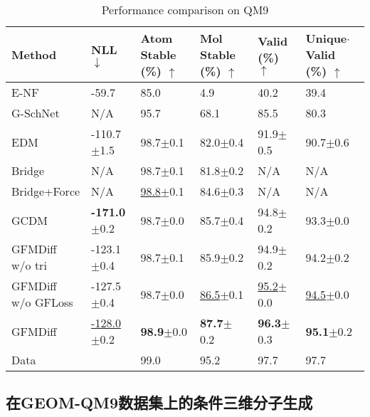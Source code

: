 \begin{table}[h]
    \centering
    \caption{Performance comparison on QM9}
    \label{tab:exp_qm9}
    \begin{tabular}{llllll}
    \hline
    Method & NLL$\downarrow$ & \makecell[l]{Atom\\Stable\\(\%) $\uparrow$} & \makecell[l]{Mol\\Stable\\(\%) $\uparrow$} & \makecell[l]{Valid\\(\%) $\uparrow$} & \makecell[l]{Unique$\cdot$Valid\\(\%) $\uparrow$} \\
    \hline
    E-NF & -59.7 & 85.0 & 4.9 & 40.2 & 39.4 \\
    G-SchNet & N/A & 95.7 & 68.1 & 85.5 & 80.3 \\
    EDM & -110.7$\pm$1.5 & 98.7$\pm$0.1 & 82.0$\pm$0.4 & 91.9$\pm$0.5 & 90.7$\pm$0.6 \\
    Bridge & N/A & 98.7$\pm$0.1 & 81.8$\pm$0.2 & N/A & N/A \\
    Bridge+Force & N/A & \underline{98.8}$\pm$0.1 & 84.6$\pm$0.3 & N/A & N/A \\
    GCDM & \textbf{-171.0}$\pm$0.2 & 98.7$\pm$0.0 & 85.7$\pm$0.4 & 94.8$\pm$0.2 & 93.3$\pm$0.0 \\
    \hline
    \makecell[l]{GFMDiff\\w/o tri} & -123.1$\pm$0.4 & 98.7$\pm$0.1 & 85.9$\pm$0.2 & 94.9$\pm$0.2 & 94.2$\pm$0.2 \\
    \makecell[l]{GFMDiff\\w/o GFLoss} & -127.5$\pm$0.4 & 98.7$\pm$0.0 & \underline{86.5}$\pm$0.1 & \underline{95.2}$\pm$0.0 & \underline{94.5}$\pm$0.0 \\
    GFMDiff & \underline{-128.0}$\pm$0.2 & \textbf{98.9}$\pm$0.0 & \textbf{87.7}$\pm$0.2 & \textbf{96.3}$\pm$0.3 & \textbf{95.1}$\pm$0.2 \\
    \hline
    Data &  & 99.0 & 95.2 & 97.7 & 97.7 \\
    \hline
    \end{tabular}
\end{table}

\subsection{在GEOM-QM9数据集上的条件三维分子生成}

